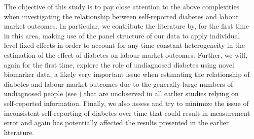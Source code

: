 The objective of this study is to pay close attention to the above
complexities when investigating the relationship between
self-reported diabetes and labour market outcomes. In particular,
we contribute the literature by, for the first time in this area, making use of the panel structure of our data to apply individual level fixed effects in order to account for any time constant heterogeneity in the estimation of the effect of diabetes on labour market outcomes. Further, we will, again for the first time, explore the role of undiagnosed diabetes using novel biomarker data, a likely very important issue when estimating the relationship of diabetes and labour market outcomes due to the generally large numbers of undiagnosed people (see \citet{Beagley2014}) that are unobserved in all earlier studies relying on self-reported information. Finally, we also assess and try to minimize the issue of inconsistent self-reporting of diabetes over time that could result in measurement error and again has potentially affected the results presented in the earlier literature.

